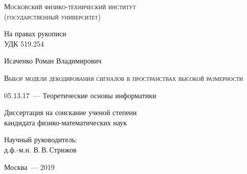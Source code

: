 \thispagestyle{empty}


\begin{titlepage}
	\begin{center}
		\textsc{Московский физико-технический институт \\ (государственный университет)}\\
	\end{center}
	\vspace{1.5cm}
	\begin{flushright}
		{На правах рукописи\\
			УДК 519.254}
	\end{flushright}
	\vspace{1.5cm}
	\begin{center}
		{Исаченко Роман Владимирович}
		\par
		\vspace{2cm}
		\textsc{Выбор модели декодирования сигналов в пространствах высокой размерности}
		\par
		\vspace{2cm}
		{05.13.17~--- Теоретические основы информатики}
		\par
		\vspace{2cm}
		{Диссертация на соискание ученой степени\\
			кандидата физико-математических наук}
	\end{center}
	\vspace{2cm}
	\hfill\parbox{8,4cm}{Научный руководитель:
		\\д.ф.-м.н. В.\,В.\,Стрижов}
	\par
	\vspace{3.5cm}
	\begin{center}
		{Москва~--- 2019}
	\end{center}
\end{titlepage}